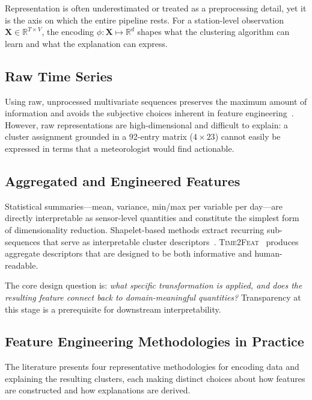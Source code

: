 \documentclass{article}
\theoremstyle{plain}
\theoremstyle{definition}
\theoremstyle{remark}
\begin{document}
Representation is often underestimated or treated as a preprocessing
detail, yet it is the axis on which the entire pipeline rests. For a
station-level observation $\mathbf{X} \in \mathbb{R}^{T \times V}$, the
encoding $\phi : \mathbf{X} \mapsto \mathbb{R}^d$ shapes what the
clustering algorithm can learn and what the explanation can express.

\subsection{Raw Time Series}

Using raw, unprocessed multivariate sequences preserves the maximum
amount of information and avoids the subjective choices inherent in
feature engineering~\cite{alvarez-garcia_comprehensive_2024}. However, raw representations are high-dimensional
and difficult to explain: a cluster assignment grounded in a 92-entry
matrix ($4 \times 23$) cannot easily be expressed in terms that a
meteorologist would find actionable.

\subsection{Aggregated and Engineered Features}

Statistical summaries---mean, variance, min/max per variable per
day---are directly interpretable as sensor-level quantities and
constitute the simplest form of dimensionality reduction. Shapelet-based
methods extract recurring sub-sequences that serve as interpretable
cluster descriptors~\cite{ye_time_2009}. \textsc{Time2Feat}~\cite{bonifati_time2feat_2022}
produces aggregate descriptors that are designed to be both informative
and human-readable.

The core design question is: \emph{what specific transformation is
applied, and does the resulting feature connect back to
domain-meaningful quantities?} Transparency at this stage is a
prerequisite for downstream interpretability.

\subsection{Feature Engineering Methodologies in Practice}
\label{subsec:feat_methods}

The literature presents four representative methodologies for encoding
data and explaining the resulting clusters, each making distinct choices
about how features are constructed and how explanations are derived.
\end{document}
